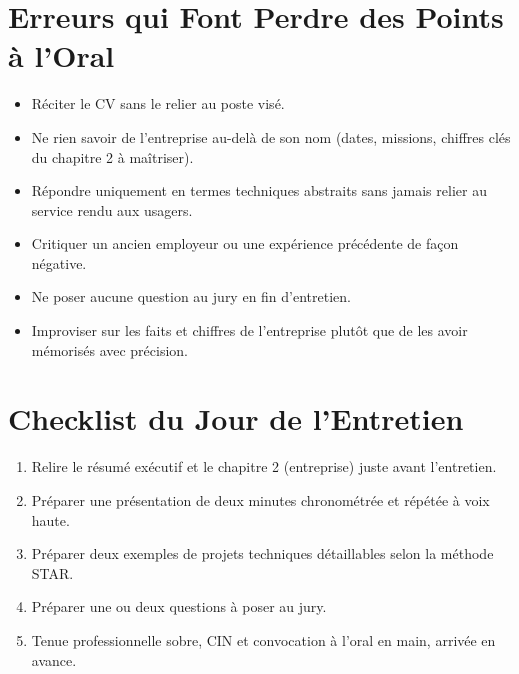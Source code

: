 \section{Erreurs qui Font Perdre des Points à l'Oral}
\begin{itemize}
    \item Réciter le CV sans le relier au poste visé.
    \item Ne rien savoir de l'entreprise au-delà de son nom (dates, missions, chiffres clés du chapitre 2 à maîtriser).
    \item Répondre uniquement en termes techniques abstraits sans jamais relier au service rendu aux usagers.
    \item Critiquer un ancien employeur ou une expérience précédente de façon négative.
    \item Ne poser aucune question au jury en fin d'entretien.
    \item Improviser sur les faits et chiffres de l'entreprise plutôt que de les avoir mémorisés avec précision.
\end{itemize}

\section{Checklist du Jour de l'Entretien}
\begin{enumerate}
    \item Relire le résumé exécutif et le chapitre 2 (entreprise) juste avant l'entretien.
    \item Préparer une présentation de deux minutes chronométrée et répétée à voix haute.
    \item Préparer deux exemples de projets techniques détaillables selon la méthode STAR.
    \item Préparer une ou deux questions à poser au jury.
    \item Tenue professionnelle sobre, CIN et convocation à l'oral en main, arrivée en avance.
\end{enumerate}

